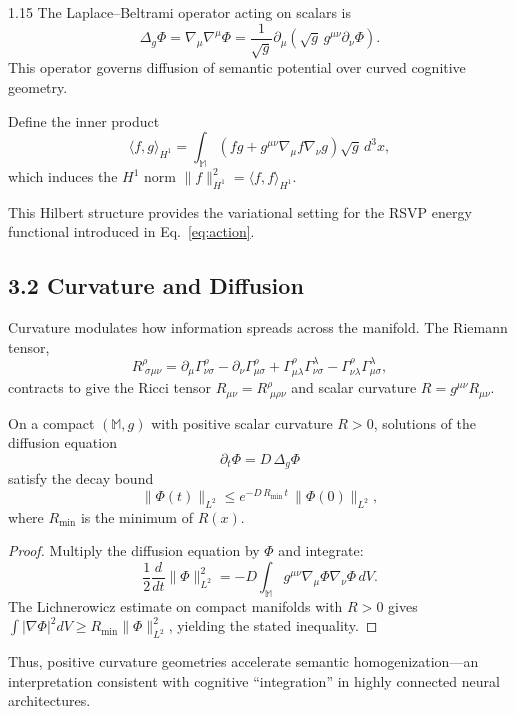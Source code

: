 \documentclass[12pt,a4paper]{article}
\begin{document}
\begin{spacing}{1.15}
The Laplace–Beltrami operator acting on scalars is
\[
\Delta_g \Phi = \nabla_\mu\nabla^\mu\Phi
= \frac{1}{\sqrt{g}}\partial_\mu(\sqrt{g}\,g^{\mu\nu}\partial_\nu\Phi).
\]
This operator governs diffusion of semantic potential over curved cognitive geometry.

\begin{definition}
Define the inner product
\[
\langle f, g \rangle_{H^1} = \int_{\mathbb{M}}
\left( f g + g^{\mu\nu}\nabla_\mu f \nabla_\nu g \right)\sqrt{g}\,d^3x,
\]
which induces the $H^1$ norm
$\|f\|_{H^1}^2 = \langle f,f\rangle_{H^1}$.
\]
\end{definition}

This Hilbert structure provides the variational setting for the RSVP energy functional introduced in Eq.~\eqref{eq:action}.

\subsection{3.2 Curvature and Diffusion}

Curvature modulates how information spreads across the manifold.
The Riemann tensor,
\[
R^{\rho}_{\;\sigma\mu\nu}
 = \partial_\mu \Gamma^{\rho}_{\nu\sigma}
 - \partial_\nu \Gamma^{\rho}_{\mu\sigma}
 + \Gamma^{\rho}_{\mu\lambda}\Gamma^{\lambda}_{\nu\sigma}
 - \Gamma^{\rho}_{\nu\lambda}\Gamma^{\lambda}_{\mu\sigma},
\]
contracts to give the Ricci tensor
$R_{\mu\nu} = R^{\rho}_{\;\mu\rho\nu}$ and scalar curvature
$R = g^{\mu\nu}R_{\mu\nu}$.

\begin{proposition}
On a compact $(\mathbb{M},g)$ with positive scalar curvature $R>0$, solutions of the diffusion equation
\[
\partial_t\Phi = D\,\Delta_g\Phi
\]
satisfy the decay bound
\[
\|\Phi(t)\|_{L^2} \le
 e^{-D\,R_{\min}\,t}\,\|\Phi(0)\|_{L^2},
\]
where $R_{\min}$ is the minimum of $R(x)$.
\end{proposition}

\begin{proof}
Multiply the diffusion equation by $\Phi$ and integrate:
\[
\frac{1}{2}\frac{d}{dt}\|\Phi\|_{L^2}^2
= -D\int_{\mathbb{M}} g^{\mu\nu}\nabla_\mu\Phi\nabla_\nu\Phi\,dV.
\]
The Lichnerowicz estimate on compact manifolds with $R>0$ gives
$\int |\nabla\Phi|^2 dV \ge R_{\min}\|\Phi\|_{L^2}^2$,
yielding the stated inequality.
\end{proof}

Thus, positive curvature geometries accelerate semantic homogenization—an interpretation consistent with cognitive “integration” in highly connected neural architectures.


\end{spacing}
\end{document}
